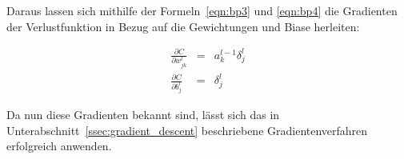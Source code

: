 Daraus lassen sich mithilfe der Formeln~\ref{eqn:bp3} und \ref{eqn:bp4} die Gradienten der Verlustfunktion in Bezug auf die Gewichtungen und Biase herleiten:

\begin{eqnarray}
\frac{\partial C}{\partial w_{jk}^l}&=&a_k^{l-1}\delta_j^l\\
\frac{\partial C}{\partial b_{j}^l}&=&\delta_j^l
\end{eqnarray}

Da nun diese Gradienten bekannt sind, lässt sich das in Unterabschnitt~\ref{ssec:gradient_descent} beschriebene Gradientenverfahren erfolgreich anwenden.